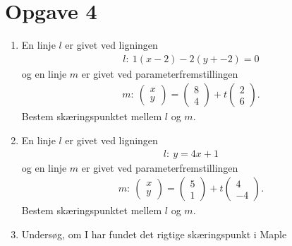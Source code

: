 \section*{Opgave 4}
\begin{enumerate}[label=\roman*)]
	\item En linje $l$ er givet ved ligningen 
	\begin{align*}
		l: \ 1(x-2) -2(y+-2) = 0
	\end{align*}
	og en linje $m$ er givet ved parameterfremstillingen
	\begin{align*}
		m: \
		\begin{pmatrix}
			x \\ y
		\end{pmatrix} =
		\begin{pmatrix}
			8\\ 4
		\end{pmatrix}
		+ t
		\begin{pmatrix}
			2\\6
		\end{pmatrix}.	
	\end{align*}
	Bestem skæringspunktet mellem $l$ og $m$. 
	\item En linje $l$ er givet ved ligningen 
	\begin{align*}
		l: \ y = 4x+1
	\end{align*}
	og en linje $m$ er givet ved parameterfremstillingen
	\begin{align*}
		m: \
		\begin{pmatrix}
			x \\ y
		\end{pmatrix} =
		\begin{pmatrix}
			5\\ 1
		\end{pmatrix}
		+ t
		\begin{pmatrix}
			4\\-4
		\end{pmatrix}.	
	\end{align*}
	Bestem skæringspunktet mellem $l$ og $m$. 
	\item Undersøg, om I har fundet det rigtige skæringspunkt i Maple
\end{enumerate}

